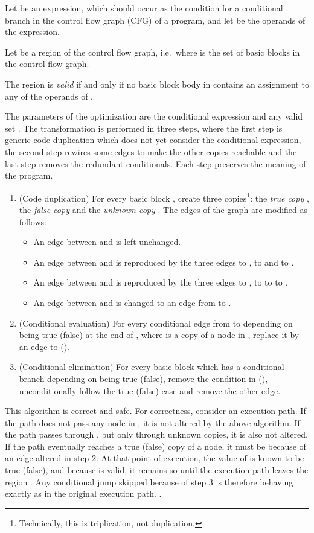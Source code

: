 \documentclass[halfparskip]{scrartcl}
\begin{document}
Let  be an expression, which should occur as the condition for a conditional branch in the control flow graph (CFG) of a program, and let  be the operands of the expression.

Let  be a region of the control flow graph, i.e.\  where  is the set of basic blocks in the control flow graph.

The region  is \textit{valid} if and only if no basic block body in  contains an assignment to any of the operands  of .

The parameters of the optimization are the conditional expression  and any valid set . The transformation is performed in three steps, where the first step is generic code duplication which does not yet consider the conditional expression, the second step rewires some edges to make the other copies reachable and the last step removes the redundant conditionals. Each step preserves the meaning of the program.

\begin{enumerate}
\item (Code duplication) For every basic block , create three copies\footnote{Technically, this is triplication, not duplication.}: the \textit{true copy} , the \textit{false copy}  and the \textit{unknown copy} . The edges of the graph are modified as follows:
\begin{itemize}
\item An edge between  and  is left unchanged.
\item An edge between  and  is reproduced by the three edges  to ,  to  and  to .
\item An edge between  and  is reproduced by the three edges  to ,  to  to  to .
\item An edge between  and  is changed to an edge from  to .
\end{itemize}
\item (Conditional evaluation) For every conditional edge from  to  depending on  being true (false) at the end of , where  is a copy of a node in , replace it by an edge  to  ().
\item (Conditional elimination) For every basic block  which has a conditional branch depending on  being true (false), remove the condition in  (), unconditionally follow the true (false) case and remove the other edge.
\end{enumerate}

This algorithm is correct and safe. For correctness, consider an execution path. If the path does not pass any node in , it is not altered by the above algorithm. If the path passes through , but only through unknown copies, it is also not altered. If the path eventually reaches a true (false) copy of a node, it must be because of an edge altered in step 2. At that point of execution, the value of  is known to be true (false), and because  is valid, it remains so until the execution path leaves the region . Any conditional jump skipped because of step 3 is therefore behaving exactly as in the original execution path.
.
\end{document}
